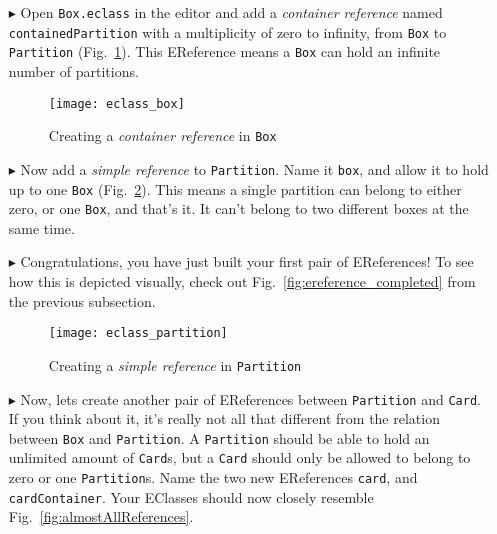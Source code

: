 \begin{itemize}

\item[$\blacktriangleright$] Open \texttt{Box.eclass} in the editor and add a \emph{container reference} named \texttt{containedPartition} with a
multiplicity of zero to infinity, from \texttt{Box} to \texttt{Partition} (Fig.~\ref{fig:cpartitionReference}). This EReference means a \texttt{Box}
can hold an infinite number of partitions.

\vspace{0.5cm}

\begin{figure}[htbp]
	\centering
  \texttt{[image: eclass\_box]}
	\caption{Creating a \emph{container reference} in \texttt{Box}}
	\label{fig:cpartitionReference}
\end{figure} 

\vspace{0.5cm}

\item[$\blacktriangleright$] Now add a \emph{simple reference} to \texttt{Partition}. Name it \texttt{box}, and allow it to hold up to one \texttt{Box}
(Fig.~\ref{fig:boxReference}). This means a single partition can belong to either zero, or one \texttt{Box}, and that's it. It can't belong to two different
boxes at the same time.

\item[$\blacktriangleright$] Congratulations, you have just built your first pair of EReferences! To see how this is depicted visually, check out
Fig.~\ref{fig:ereference_completed} from the previous subsection.

\newpage

\vspace{0.5cm}

\begin{figure}[htbp]
	\centering
  \texttt{[image: eclass\_partition]}
	\caption{Creating a \emph{simple reference} in \texttt{Partition}}
	\label{fig:boxReference}
\end{figure} 

\vspace{0.5cm}

\item[$\blacktriangleright$] Now, lets create another pair of EReferences between \texttt{Partition} and \texttt{Card}. If you think about it, it's really not
all that different from the relation between \texttt{Box} and \texttt{Partition}. A \texttt{Partition} should be able to hold an unlimited amount of
\texttt{Card}s, but a \texttt{Card} should only be allowed to belong to zero or one \texttt{Partition}s. Name the two new EReferences
\texttt{card}, and \texttt{cardContainer}. Your EClasses should now closely resemble Fig.~\ref{fig:almostAllReferences}.


\end{itemize}
